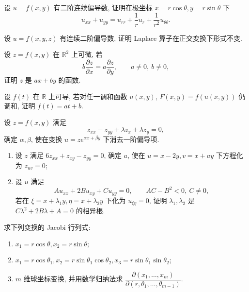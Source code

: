 \documentclass[../数学分析培优讲义.tex]{subfiles}
\begin{document}
\begin{example}
设 $u=f(x,y)$ 有二阶连续偏导数, 证明在极坐标 $x=r\cos\theta,y=r\sin\theta$ 下
\[
    u_{xx}+u_{yy}=u_{rr}+\dfrac{1}{r}u_r+\dfrac{1}{r^2}u_{\theta\theta}.
\]
\end{example}
\exampleblank

\begin{example}
设 $u=f(x,y,z)$ 有连续二阶偏导数, 证明 Laplace 算子在正交变换下形式不变.
\end{example}
\exampleblank

\begin{example}
设 $z=f(x,y)$ 在 $\mathbb{R}^2$ 上可微, 若
\[
    b\dfrac{\partial z}{\partial x}=a\dfrac{\partial z}{\partial y},
    \qquad a\ne0,\ b\ne0,
\]
证明 $z$ 是 $ax+by$ 的函数.
\end{example}
\exampleblank

\begin{example}
设 $f(t)$ 在 $\mathbb{R}$ 上可导, 若对任一调和函数 $u(x,y)$, $F(x,y)=f(u(x,y))$ 仍调和, 证明 $f(t)=at+b$.
\end{example}
\exampleblank

\begin{example}
设 $z=f(x,y)$ 满足
\[
    z_{xx}-z_{yy}+\lambda z_x+\lambda z_y=0,
\]
确定 $\alpha,\beta$, 使在变换 $u=ze^{\alpha x+\beta y}$ 下消去一阶偏导项.
\end{example}
\exampleblank

\begin{example}[\markstar]
\begin{enumerate}[label=(\arabic*)]
    \item 设 $z$ 满足 $6z_{xx}+z_{xy}-z_{yy}=0$, 确定 $a$, 使在 $u=x-2y,v=x+ay$ 下方程化为 $z_{uv}=0$;
    \item 设 $u$ 满足
    \[
        Au_{xx}+2Bu_{xy}+Cu_{yy}=0,
        \qquad AC-B^2<0,\ C\ne0,
    \]
    若在 $\xi=x+\lambda_1y,\eta=x+\lambda_2y$ 下化为 $u_{\xi\eta}=0$, 证明 $\lambda_1,\lambda_2$ 是 $C\lambda^2+2B\lambda+A=0$ 的相异根.
\end{enumerate}
\end{example}
\exampleblank

\begin{example}[\markstar]
求下列变换的 Jacobi 行列式:
\begin{enumerate}[label=(\arabic*)]
    \item $x_1=r\cos\theta,x_2=r\sin\theta$;
    \item $x_1=r\cos\theta_1,x_2=r\sin\theta_1\cos\theta_2,x_3=r\sin\theta_1\sin\theta_2$;
    \item $m$ 维球坐标变换, 并用数学归纳法求 $\dfrac{\partial(x_1,\ldots,x_m)}{\partial(r,\theta_1,\ldots,\theta_{m-1})}$.
\end{enumerate}
\end{example}
\exampleblank
\end{document}
